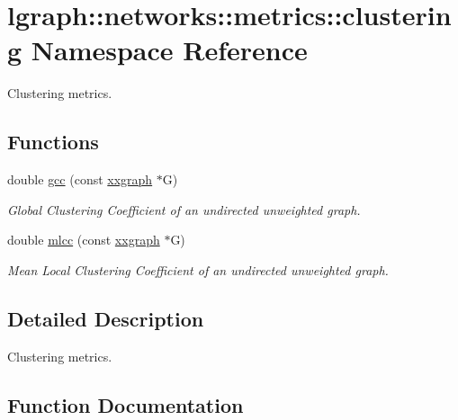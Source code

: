 \hypertarget{namespacelgraph_1_1networks_1_1metrics_1_1clustering}{}\section{lgraph\+:\+:networks\+:\+:metrics\+:\+:clustering Namespace Reference}
\label{namespacelgraph_1_1networks_1_1metrics_1_1clustering}


Clustering metrics.  


\subsection*{Functions}
\begin{DoxyCompactItemize}
\item 
double \hyperlink{namespacelgraph_1_1networks_1_1metrics_1_1clustering_a9bff132025f09b2e63f21f09ca9f6b68}{gcc} (const \hyperlink{classlgraph_1_1xxgraph}{xxgraph} $\ast$G)
\begin{DoxyCompactList}\small\item\em Global Clustering Coefficient of an undirected unweighted graph. \end{DoxyCompactList}\item 
double \hyperlink{namespacelgraph_1_1networks_1_1metrics_1_1clustering_a489c3b47b7b69eeabacbea5248dc41e4}{mlcc} (const \hyperlink{classlgraph_1_1xxgraph}{xxgraph} $\ast$G)
\begin{DoxyCompactList}\small\item\em Mean Local Clustering Coefficient of an undirected unweighted graph. \end{DoxyCompactList}\end{DoxyCompactItemize}


\subsection{Detailed Description}
Clustering metrics. 

\subsection{Function Documentation}
\mbox{\label{namespacelgraph_1_1networks_1_1metrics_1_1clustering_a9bff132025f09b2e63f21f09ca9f6b68}} 
